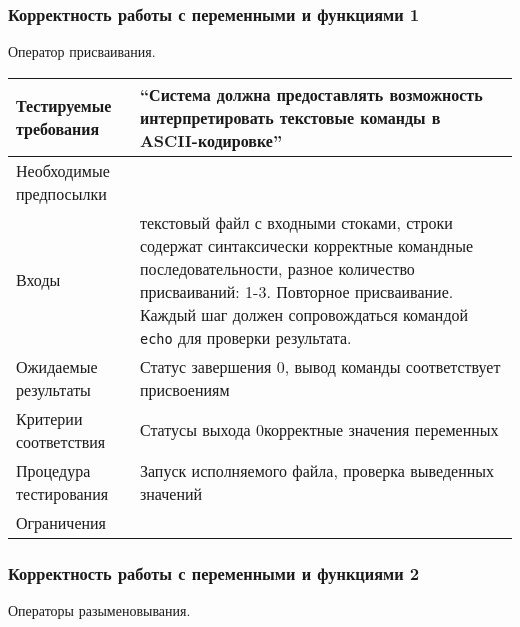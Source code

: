 \documentclass[a4paper, 12pt]{article}
\begin{document}
\subsubsection{Корректность работы с переменными и функциями 1} %
Оператор присваивания.

\begin{table}[H]
	\centering
	\begin{tabular}{|l|p{4in}|}
		\hline
		Тестируемые требования	&``Система должна предоставлять возможность интерпретировать текстовые
		команды в ASCII-кодировке''\\
		\hline
		Необходимые предпосылки	&\\
		\hline
		Входы			&текстовый файл с входными стоками,\newline
		строки содержат синтаксически корректные командные последовательности,
		разное количество присваиваний: 1-3. Повторное присваивание. Каждый шаг
		должен сопровождаться командой {\tt echo} для проверки результата.\\
		\hline
		Ожидаемые результаты	&Статус завершения 0, вывод команды соответствует присвоениям\\
		\hline
		Критерии соответствия	&Статусы выхода 0\newline корректные значения переменных\\
		\hline
		Процедура тестирования	&Запуск исполняемого файла, \newline проверка выведенных значений\\
		\hline
		Ограничения		&\\
		\hline
	\end{tabular}
\end{table}

\subsubsection{Корректность работы с переменными и функциями 2} %
Операторы разыменовывания.
\end{document}
